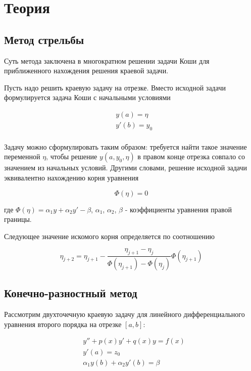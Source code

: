 \section*{Теория}

\subsection*{Метод стрельбы}

Суть метода заключена в многократном решении задачи Коши для приближенного
нахождения решения краевой задачи.

Пусть надо решить краевую задачу на отрезке. Вместо исходной
задачи формулируется задача Коши с начальными условиями

$$\begin{aligned}
    & y(a) = \eta \\
    & y'(b) = y_0 \\
\end{aligned}$$

Задачу можно сформулировать таким образом: требуется найти такое значение
переменной $\eta$, чтобы решение $y(a, y_0 ,\eta)$ в правом конце отрезка
совпало со значением из начальных условий. Другими словами,
решение исходной задачи эквивалентно нахождению корня уравнения

$$\Phi(\eta) = 0$$

где $\Phi(\eta) = \alpha_1 y + \alpha_2 y' - \beta$,
$\alpha_1$, $\alpha_2$, $\beta$ - коэффициенты уравнения правой границы.

Следующее значение искомого корня определяется по соотношению

$$\eta_{j+2} = \eta_{j+1} - \frac{\eta_{j+1}-\eta_j}
{\Phi(\eta_{j+1}) - \Phi(\eta_j)}\Phi(\eta_{j+1})$$

\subsection*{Конечно-разностный метод}

Рассмотрим двухточечную краевую задачу для линейного дифференциального
уравнения второго порядка на отрезке $[a,b]$:

$$\begin{aligned}
    & y'' + p(x)y' + q(x)y = f(x) \\
    & y'(a) = z_0 \\
    & \alpha_1 y(b) + \alpha_2 y'(b) = \beta \\
\end{aligned}$$

